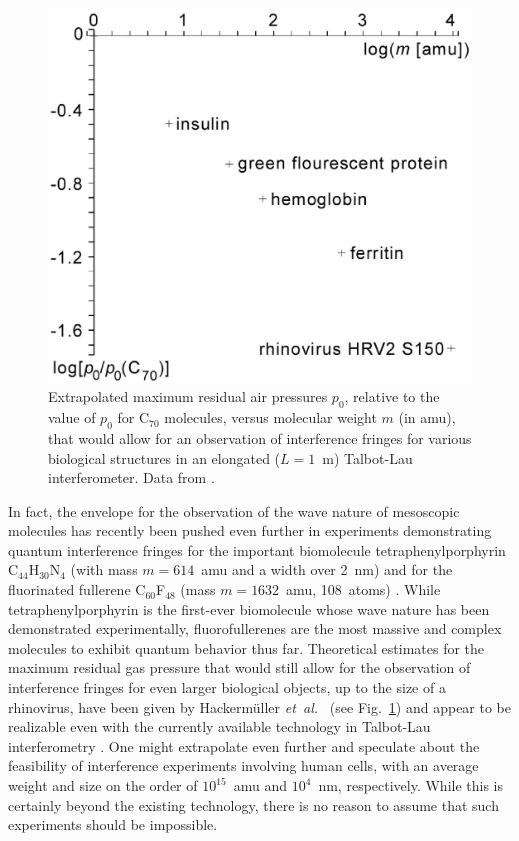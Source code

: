 \documentclass[twocolumn,aps,floatfix,amsmath,amssymb,showpacs,nofootinbib]{revtex4}
\newcommand{\etal}{\emph{et~al.\ }}
\begin{document}
\begin{figure}
\begin{center}
  \includegraphics[scale=.35]{extrapol-n.eps}
\end{center}
\caption[Extrapolated maximum residual air pressures for 
interference experiments with various
biomolecules]{\label{fig:extrapol}Extrapolated maximum residual air
  pressures $p_0$, relative to the value of $p_0$ for C$_{70}$
  molecules, versus molecular weight $m$ (in amu), that would allow
  for an observation of interference fringes for various biological
  structures in an elongated ($L = 1$~m) Talbot-Lau interferometer.
  Data from \cite{Hackermuller:2003:uu}.  }
\end{figure}

In fact, the envelope for the observation of the wave nature of
mesoscopic molecules has recently been pushed even further in
experiments demonstrating quantum interference fringes for the
important biomolecule tetraphenylporphyrin C$_{44}$H$_{30}$N$_4$ (with
mass $m = 614$~amu and a width over 2~nm) and for the fluorinated
fullerene C$_{60}$F$_{48}$ (mass $m = 1632$~amu, 108~atoms)
\cite{Hackermueller:2002:wb}. While tetraphenylporphyrin is the
first-ever biomolecule whose wave nature has been demonstrated
experimentally, fluorofullerenes are the most massive and complex
molecules to exhibit quantum behavior thus far. Theoretical estimates
for the maximum residual gas pressure that would still allow for the
observation of interference fringes for even larger biological
objects, up to the size of a rhinovirus, have been given by
Hackerm\"uller \etal \cite{Arndt:2002:bo,Hackermuller:2003:uu} (see
Fig.~\ref{fig:extrapol}) and appear to be realizable even with the
currently available technology in Talbot-Lau interferometry
\cite{Hornberger:2003:tv,Hackermuller:2003:uu}. One might extrapolate
even further and speculate about the feasibility of interference
experiments involving human cells, with an average weight and size on
the order of $10^{15}$~amu and $10^4$~nm, respectively.  While this is
certainly beyond the existing technology, there is no reason to assume
that such experiments should be impossible.
\end{document}
